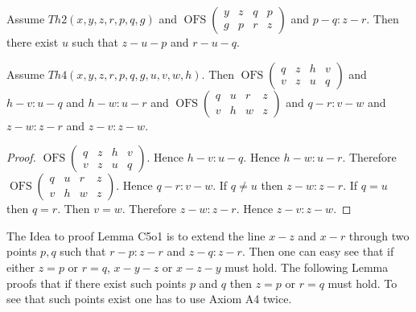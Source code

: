 \documentclass{article}
\newcommand{\OFS}[8]{\operatorname{OFS}
\left(\begin{smallmatrix}%
#1 & #2 & #3 & #4 \\
#5 & #6 & #7 & #8
\end{smallmatrix}\right)%
}
\begin{document}
\begin{forthel}
    \begin{lemma}[C5o1n]
      Assume $Th2(x,y,z,r,p,q,g)$ and $\OFS{y}{z}{q}{p}{g}{p}{r}{z}$ and $p-q : z-r$. Then there exist $u$ such that $z-u-p$ and $r-u-q$.
    \end{lemma}

    \begin{lemma}[C5o1o]
      Assume $Th4(x,y,z,r,p,q,g,u,v,w,h)$. Then $\OFS{q}{z}{h}{v}{v}{z}{u}{q}$ and $h-v : u-q$ and $h-w : u-r$ and $\OFS{q}{u}{r}{z}{v}{h}{w}{z}$ and $q-r : v-w$ and $z-w : z-r$ and $z-v : z-w$.
    \end{lemma}
    \begin{proof}
    	$\OFS{q}{z}{h}{v}{v}{z}{u}{q}$. Hence $h-v : u-q$.
      Hence $h-w : u-r$. %
    	Therefore $\OFS{q}{u}{r}{z}{v}{h}{w}{z}$. Hence $q-r : v-w$. If $q \neq u$ then $z-w : z-r$.
      If $q = u$ then $q = r$. %
    	Then $v = w$. Therefore $z-w : z-r$. Hence $z-v : z-w$.
    \end{proof}
  \end{forthel}

  The Idea to proof Lemma C5o1 is to extend the line $x-z$ and $x-r$ through two points $p,q$ such that $r-p : z-r$ and $z-q : z-r$. Then one can easy see that if either $z = p$ or $r = q$, $x-y-z$ or $x-z-y$ must hold. The following Lemma proofs that if there exist such points $p$ and $q$ then $z = p$ or $r = q$ must hold. To see that such points exist one has to use Axiom A4 twice.
\end{document}
